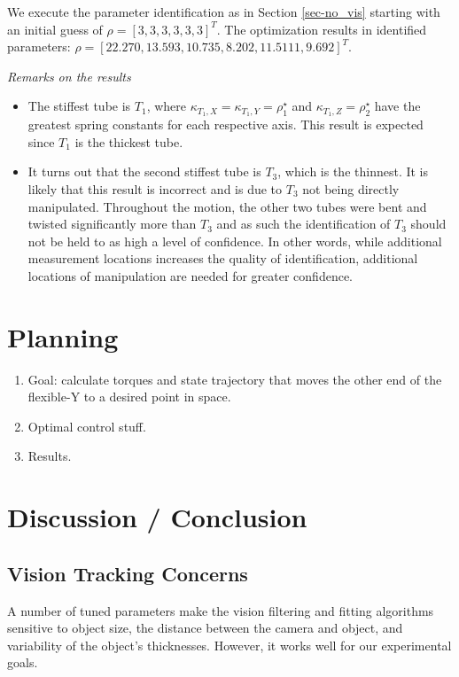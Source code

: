 \documentclass[runningheads,a4paper]{llncs}
\begin{document}
We execute the parameter identification as in Section \ref{sec-no_vis} starting with an initial guess of $\rho = [3, 3, 3, 3, 3, 3]^T$. The optimization results in identified parameters: $\rho = [22.270 , 13.593 , 10.735 ,  8.202  ,11.5111,   9.692]^T$.


\emph{Remarks on the results}
\begin{itemize}
\item The stiffest tube is $T_1$, where $\kappa_{T_1,X} = \kappa_{T_1,Y} = \rho^\star_1$ and $\kappa_{T_1,Z} = \rho^\star_2$ have the greatest spring constants for each respective axis. This result is expected since $T_1$ is the thickest tube. 
\item It turns out that the second stiffest tube is $T_3$, which is the thinnest. It is likely that this result is incorrect and is due to $T_3$ not being directly manipulated. Throughout the motion, the other two tubes were bent and twisted significantly more than $T_3$ and as such the identification of $T_3$ should not be held to as high a level of confidence.  In other words, while additional measurement locations increases the quality of identification, additional locations of manipulation are needed for greater confidence.
\end{itemize}

\section{Planning}
\label{sec-plan}
\begin{enumerate}
\item Goal: calculate torques and state trajectory that moves the other end of the flexible-Y to a desired point in space.
\item Optimal control stuff.
\item Results.
\end{enumerate}

\section{Discussion / Conclusion}
\label{sec-conc}
\subsection{Vision Tracking Concerns \label{sec-vis_disc}}

A number of tuned parameters make the vision filtering and fitting algorithms sensitive to object size, the distance between the camera and object, and variability of the object's thicknesses. However, it works well for our experimental goals.
\end{document}
